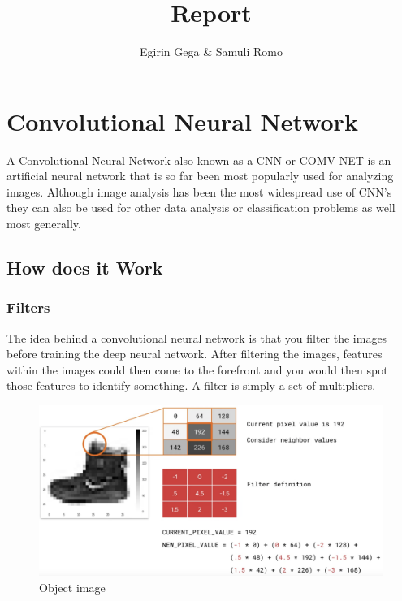\documentclass{article}
\title{Report}
\author{Egirin Gega \&  Samuli Romo}
\begin{document}
  \maketitle

  \newpage
  \tableofcontents
  \newpage
  \listoffigures

  \newpage
  \section{Convolutional Neural Network}
  A Convolutional Neural Network also known as a CNN or COMV NET is an artificial neural network that is so far been most popularly used for analyzing images. Although image analysis has been the most widespread use of CNN's they can also be used for other data analysis or classification problems as well most generally.
  \subsection{How does it Work}
    \subsubsection{Filters}
    The idea behind a convolutional neural network is that you filter the images before training the deep neural network. After filtering the images, features within the images could then come to the forefront and you would then spot those features to identify something.
    A filter is simply a set of multipliers. 
    \vspace{20mm}
    \begin{figure}[h!]
      \begin{center}
        \includegraphics[width=\linewidth]{img/img2.png}
        \caption{Object image}
        \label{fig:snn}
      \end{center}
    \end{figure}
\end{document}
